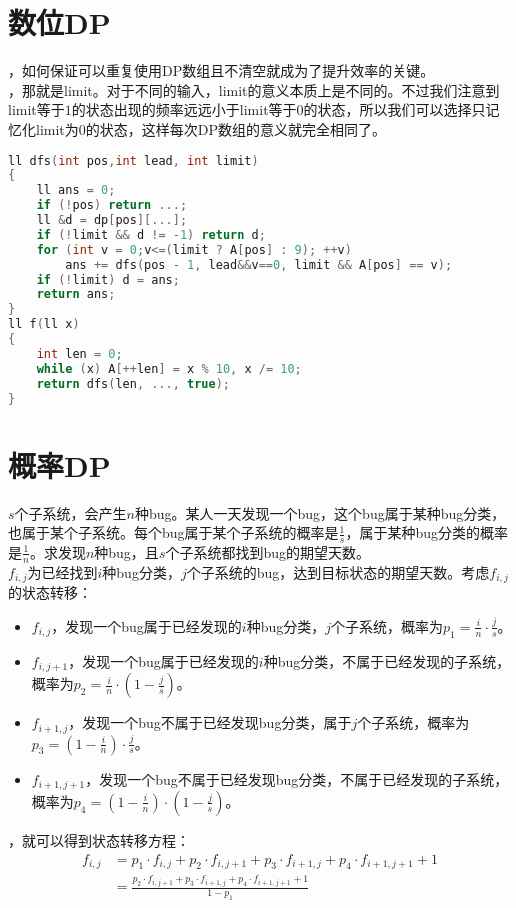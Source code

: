 \documentclass[a4paper]{book}
\begin{document}
\section{数位DP}
，如何保证可以重复使用DP数组且不清空就成为了提升效率的关键。\\
，那就是limit。对于不同的输入，limit的意义本质上是不同的。不过我们注意到limit等于$1$的状态出现的频率远远小于limit等于$0$的状态，所以我们可以选择只记忆化limit为$0$的状态，这样每次DP数组的意义就完全相同了。
\begin{lstlisting}[language=c++]
ll dfs(int pos,int lead, int limit)
{
    ll ans = 0;
    if (!pos) return ...;
    ll &d = dp[pos][...];
    if (!limit && d != -1) return d;
    for (int v = 0;v<=(limit ? A[pos] : 9); ++v)
        ans += dfs(pos - 1, lead&&v==0, limit && A[pos] == v);
    if (!limit) d = ans;
    return ans;
}
ll f(ll x)
{
    int len = 0;
    while (x) A[++len] = x % 10, x /= 10;
    return dfs(len, ..., true);
}
\end{lstlisting}
\section{概率DP}
$s$个子系统，会产生$n$种bug。某人一天发现一个bug，这个bug属于某种bug分类，也属于某个子系统。每个bug属于某个子系统的概率是$\frac{1}{s}$，属于某种bug分类的概率是$\frac{1}{n}$。求发现$n$种bug，且$s$个子系统都找到bug的期望天数。\\
$f_{i,j}$为已经找到$i$种bug分类，$j$个子系统的bug，达到目标状态的期望天数。考虑$f_{i,j}$的状态转移：
\begin{itemize}
    \item $f_{i,j}$，发现一个bug属于已经发现的$i$种bug分类，$j$个子系统，概率为$p_1=\frac{i}{n}\cdot\frac{j}{s}$。
    \item $f_{i,j+1}$，发现一个bug属于已经发现的$i$种bug分类，不属于已经发现的子系统，概率为$p_2=\frac{i}{n}\cdot(1-\frac{j}{s})$。
    \item $f_{i+1,j}$，发现一个bug不属于已经发现bug分类，属于$j$个子系统，概率为$p_3=(1-\frac{i}{n})\cdot\frac{j}{s}$。
    \item $f_{i+1,j+1}$，发现一个bug不属于已经发现bug分类，不属于已经发现的子系统，概率为$p_4=(1-\frac{i}{n})\cdot(1-\frac{j}{s})$。  
\end{itemize}
，就可以得到状态转移方程：
$$
\begin{aligned}
    f_{i,j}&=p_1\cdot f_{i,j}+p_2\cdot f_{i,j+1}+p_3\cdot f_{i+1,j}+p_4\cdot f_{i+1,j+1}+1\\
           &=\frac{p_2\cdot f_{i,j+1}+p_3\cdot f_{i+1,j}+p_4\cdot f_{i+1,j+1}+1}{1-p_1}
\end{aligned}
$$
\ifx\allfiles\undefined
\end{document}
